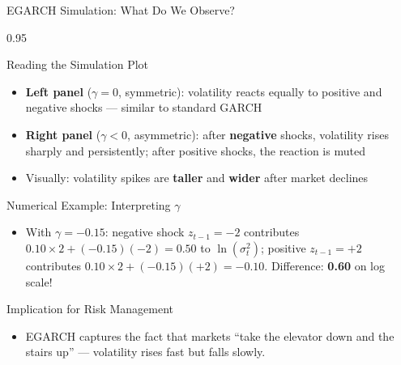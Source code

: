 \documentclass[9pt, aspectratio=169, t]{beamer}
\begin{document}
\begin{frame}{EGARCH Simulation: What Do We Observe?}
    \begin{cminipage}{0.95\textwidth}
    \vspace{-0.3cm}
    {\scriptsize
        \begin{block}{Reading the Simulation Plot}
            \begin{itemize}\setlength{\itemsep}{0pt}
                \item \textbf{Left panel} ($\gamma = 0$, symmetric): volatility reacts equally to positive and negative shocks --- similar to standard GARCH
                \item \textbf{Right panel} ($\gamma < 0$, asymmetric): after \textbf{negative} shocks, volatility rises sharply and persistently; after positive shocks, the reaction is muted
                \item Visually: volatility spikes are \textbf{taller} and \textbf{wider} after market declines
            \end{itemize}
        \end{block}
        \vspace{-1mm}
        \begin{exampleblock}{Numerical Example: Interpreting $\gamma$}
            \begin{itemize}\setlength{\itemsep}{0pt}
                \item With $\gamma = -0.15$: negative shock $z_{t-1} = -2$ contributes $0.10 \times 2 + (-0.15)(-2) = 0.50$ to $\ln(\sigma_t^2)$; positive $z_{t-1} = +2$ contributes $0.10 \times 2 + (-0.15)(+2) = -0.10$. Difference: \textbf{0.60} on log scale!
            \end{itemize}
        \end{exampleblock}
        \vspace{-1mm}
        \begin{alertblock}{Implication for Risk Management}
            \begin{itemize}\setlength{\itemsep}{0pt}
                \item EGARCH captures the fact that markets ``take the elevator down and the stairs up'' --- volatility rises fast but falls slowly.
            \end{itemize}
        \end{alertblock}
    }
    \end{cminipage}
\end{frame}
\end{document}
